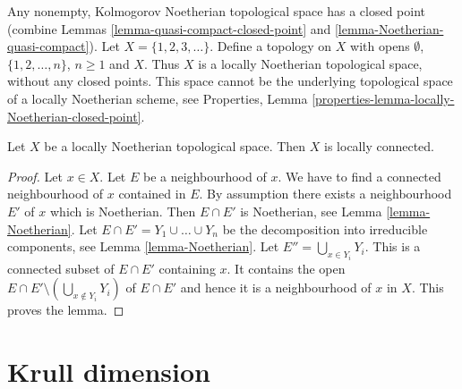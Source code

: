 \begin{example}
\label{example-locally-Noetherian-no-closed-point}
Any nonempty, Kolmogorov Noetherian topological space has a closed point
(combine Lemmas \ref{lemma-quasi-compact-closed-point} and
\ref{lemma-Noetherian-quasi-compact}).
Let $X = \{1, 2, 3, \ldots \}$. Define a topology on $X$
with opens $\emptyset$, $\{1, 2, \ldots, n\}$, $n \geq 1$
and $X$. Thus $X$ is a locally Noetherian topological space,
without any closed points. This space cannot be the underlying
topological space of a locally Noetherian scheme, see
Properties, Lemma \ref{properties-lemma-locally-Noetherian-closed-point}.
\end{example}

\begin{lemma}
\label{lemma-locally-Noetherian-locally-connected}
Let $X$ be a locally Noetherian topological space.
Then $X$ is locally connected.
\end{lemma}

\begin{proof}
Let $x \in X$. Let $E$ be a neighbourhood of $x$.
We have to find a connected neighbourhood of $x$ contained
in $E$. By assumption there exists a neighbourhood $E'$ of $x$
which is Noetherian. Then $E \cap E'$ is Noetherian, see
Lemma \ref{lemma-Noetherian}.
Let $E \cap E' = Y_1 \cup \ldots \cup Y_n$ be the decomposition
into irreducible components, see
Lemma \ref{lemma-Noetherian}.
Let $E'' = \bigcup_{x \in Y_i} Y_i$. This is a connected
subset of $E \cap E'$ containing $x$. It contains the open
$E \cap E' \setminus (\bigcup_{x \not \in Y_i} Y_i)$ of $E \cap E'$
and hence it is a neighbourhood of $x$ in $X$. This proves the lemma.
\end{proof}



\section{Krull dimension}
\label{section-krull-dimension}

